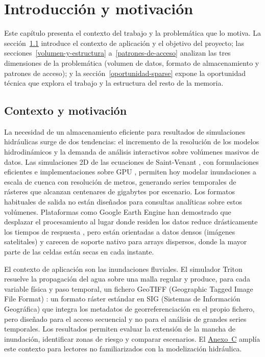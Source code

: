 \chapter{Introducción y motivación}\label{introduccion-y-motivacion}

Este capítulo presenta el contexto del trabajo y la problemática que lo motiva. La sección~\ref{contexto-y-motivacion} introduce el contexto de aplicación y el objetivo del proyecto; las secciones~\ref{volumen-y-estructura} a~\ref{patrones-de-acceso} analizan las tres dimensiones de la problemática (volumen de datos, formato de almacenamiento y patrones de acceso); y la sección~\ref{oportunidad-sparse} expone la oportunidad técnica que explora el trabajo y la estructura del resto de la memoria.

\section{Contexto y motivación}\label{contexto-y-motivacion}

La necesidad de un almacenamiento eficiente para resultados de simulaciones hidráulicas surge de dos tendencias: el incremento de la resolución de los modelos hidrodinámicos y la demanda de análisis interactivos sobre volúmenes masivos de datos. Las simulaciones 2D de las ecuaciones de Saint-Venant \cite{saintvenant1871}, con formulaciones eficientes \cite{bates2010simple} e implementaciones sobre GPU \cite{morales2021triton}, permiten hoy modelar inundaciones a escala de cuenca con resolución de metros, generando series temporales de rásteres que alcanzan centenares de gigabytes por escenario. Los formatos habituales de salida no están diseñados para consultas analíticas sobre estos volúmenes. Plataformas como Google Earth Engine \cite{gorelick2017earthengine} han demostrado que desplazar el procesamiento al lugar donde residen los datos reduce drásticamente los tiempos de respuesta \cite{bauer2016earthsystem}, pero están orientadas a datos densos (imágenes satelitales) y carecen de soporte nativo para arrays dispersos, donde la mayor parte de las celdas están secas en cada instante.

El contexto de aplicación son las inundaciones fluviales. El simulador Triton \cite{triton} resuelve la propagación del agua sobre una malla regular y produce, para cada variable física y paso temporal, un fichero GeoTIFF (Geographic Tagged Image File Format) \cite{ogc_geotiff}: un formato ráster estándar en SIG (Sistemas de Información Geográfica) que integra los metadatos de georreferenciación en el propio fichero, pero diseñado para el acceso secuencial y no para el análisis de grandes series temporales. Los resultados permiten evaluar la extensión de la mancha de inundación, identificar zonas de riesgo y comparar escenarios. El \hyperref[anexo-c.-contexto-de-las-simulaciones-hidraulicas]{Anexo~C} amplía este contexto para lectores no familiarizados con la modelización hidráulica.

